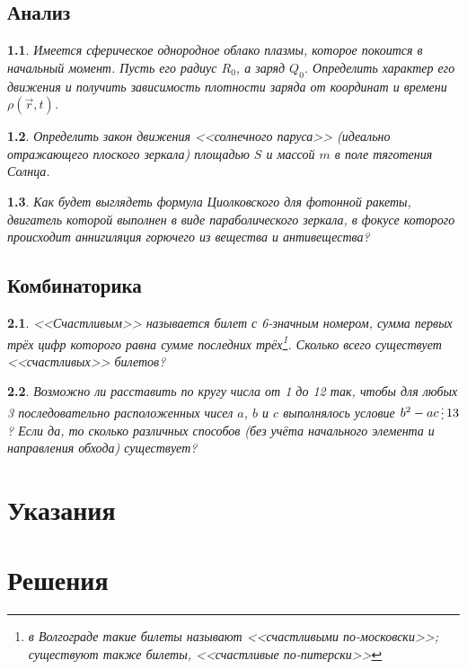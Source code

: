 \documentclass[a4paper]{book}
\theoremstyle{problemstyle}
\newtheorem{problem}{} %
\newcommand{\divisible}{\mathop{\raisebox{-2pt}{\vdots}}}
\begin{document}
    \chapter{Анализ}
    \begin{problem}
        Имеется сферическое однородное облако плазмы, которое покоится в
        начальный момент. Пусть его радиус \( R_0 \), а заряд \( Q_0 \).
        Определить характер его движения и получить зависимость плотности заряда
        от координат и времени \( \rho(\vec{r}, t) \).
    \end{problem}
    \begin{problem}
        Определить закон движения <<солнечного паруса>> (идеально
        отражающего плоского зеркала) площадью \( S \) и массой \(m\) в поле
        тяготения Солнца.
    \end{problem}
    \begin{problem}
        Как будет выглядеть формула Циолковского для фотонной ракеты, двигатель
        которой выполнен в виде параболического зеркала, в фокусе которого
        происходит аннигиляция горючего из вещества и антивещества?
    \end{problem}
    \chapter{Комбинаторика}
    \begin{problem}
        <<Счастливым>> называется билет с 6-значным номером, сумма первых трёх
        цифр которого равна сумме последних трёх\footnote{в Волгограде такие
        билеты называют <<счастливыми по-московски>>; существуют также билеты,
        <<счастливые по-питерски>>}. Сколько всего существует
        <<счастливых>> билетов?
    \end{problem}
    \begin{problem}
        Возможно ли расставить по кругу числа от 1 до 12 так, чтобы для любых 3
        последовательно расположенных чисел \(a\), \(b\) и \(c\) выполнялось
        условие \( b^2 - ac \divisible 13 \)? Если да, то сколько различных
        способов (без учёта начального элемента и направления обхода) существует?
    \end{problem}
    \part{Указания}
    \part{Решения}
\end{document}
